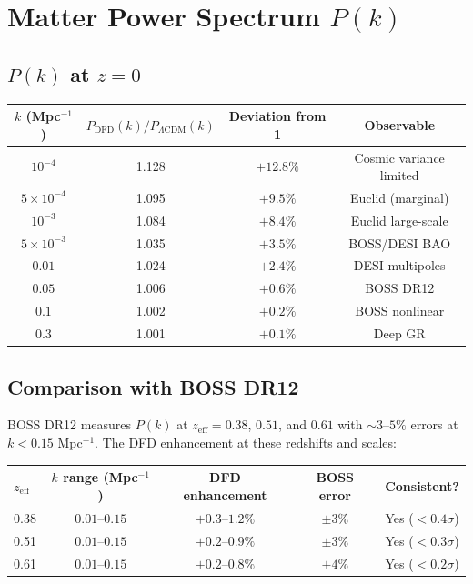 \documentclass[11pt,a4paper]{article}
\begin{document}
\section{Matter Power Spectrum $P(k)$}

\subsection{$P(k)$ at $z = 0$}

\begin{center}
\begin{longtable}{cccc}
\toprule
$k$ (Mpc$^{-1}$) & $P_{\mathrm{DFD}}(k)/P_{\Lambda\mathrm{CDM}}(k)$ & Deviation from 1 & Observable \\
\midrule
$10^{-4}$ & 1.128 & $+12.8\%$ & Cosmic variance limited \\
$5 \times 10^{-4}$ & 1.095 & $+9.5\%$ & Euclid (marginal) \\
$10^{-3}$ & 1.084 & $+8.4\%$ & Euclid large-scale \\
$5 \times 10^{-3}$ & 1.035 & $+3.5\%$ & BOSS/DESI BAO \\
$0.01$ & 1.024 & $+2.4\%$ & DESI multipoles \\
$0.05$ & 1.006 & $+0.6\%$ & BOSS DR12 \\
$0.1$ & 1.002 & $+0.2\%$ & BOSS nonlinear \\
$0.3$ & 1.001 & $+0.1\%$ & Deep GR \\
\bottomrule
\end{longtable}
\end{center}

\subsection{Comparison with BOSS DR12}

BOSS DR12 measures $P(k)$ at $z_{\mathrm{eff}} = 0.38$, $0.51$, and $0.61$ with $\sim 3$--$5\%$ errors at $k < 0.15$ Mpc$^{-1}$. The DFD enhancement at these redshifts and scales:

\begin{center}
\begin{tabular}{lcccc}
\toprule
$z_{\mathrm{eff}}$ & $k$ range (Mpc$^{-1}$) & DFD enhancement & BOSS error & Consistent? \\
\midrule
0.38 & $0.01$--$0.15$ & $+0.3$--$1.2\%$ & $\pm 3\%$ & Yes ($< 0.4\sigma$) \\
0.51 & $0.01$--$0.15$ & $+0.2$--$0.9\%$ & $\pm 3\%$ & Yes ($< 0.3\sigma$) \\
0.61 & $0.01$--$0.15$ & $+0.2$--$0.8\%$ & $\pm 4\%$ & Yes ($< 0.2\sigma$) \\
\bottomrule
\end{tabular}
\end{center}
\end{document}
